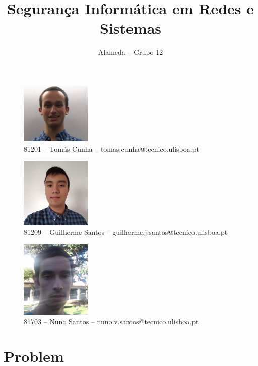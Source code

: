 \documentclass[11,]{article}
\title{Segurança Informática em Redes e Sistemas}
\author{Alameda -- Grupo 12}
\date{}
\begin{document}
\maketitle

\begin{figure}
\centering
\includegraphics[width=0.3\textwidth,height=\textheight]{81201.jpg}
\captionsetup{labelformat=empty}
\caption{81201 -- Tomás Cunha -- tomas.cunha@tecnico.ulisboa.pt}
\end{figure}

\begin{figure}
\centering
\includegraphics[width=0.3\textwidth,height=\textheight]{81209.jpg}
\captionsetup{labelformat=empty}
\caption{81209 -- Guilherme Santos --
guilherme.j.santos@tecnico.ulisboa.pt}
\end{figure}

\begin{figure}
\centering
\includegraphics[width=0.3\textwidth,height=\textheight]{81703.jpg}
\captionsetup{labelformat=empty}
\caption{81703 -- Nuno Santos -- nuno.v.santos@tecnico.ulisboa.pt}
\end{figure}

\newpage

\hypertarget{problem}{%
\section{Problem}\label{problem}}
\end{document}
